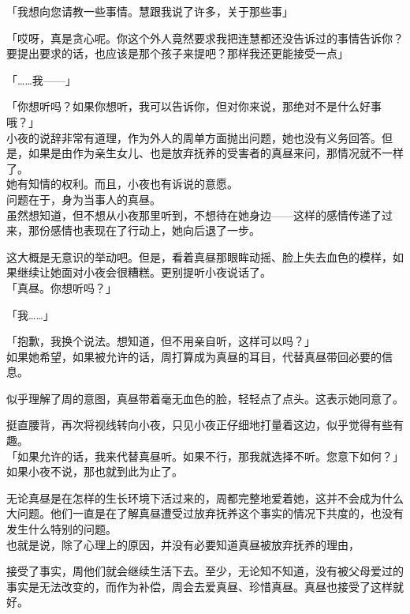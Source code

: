 「我想向您请教一些事情。慧跟我说了许多，关于那些事」

「哎呀，真是贪心呢。你这个外人竟然要求我把连慧都还没告诉过的事情告诉你？要提出要求的话，也应该是那个孩子来提吧？那样我还更能接受一点」

「……我——」

「你想听吗？如果你想听，我可以告诉你，但对你来说，那绝对不是什么好事哦？」\\

小夜的说辞非常有道理，作为外人的周单方面抛出问题，她也没有义务回答。但是，如果是由作为亲生女儿、也是放弃抚养的受害者的真昼来问，那情况就不一样了。\\

她有知情的权利。而且，小夜也有诉说的意愿。\\

问题在于，身为当事人的真昼。\\

虽然想知道，但不想从小夜那里听到，不想待在她身边——这样的感情传递了过来，那份感情也表现在了行动上，她向后退了一步。

这大概是无意识的举动吧。但是，看着真昼那眼眸动摇、脸上失去血色的模样，如果继续让她面对小夜会很糟糕。更别提听小夜说话了。\\

「真昼。你想听吗？」

「我……」

「抱歉，我换个说法。想知道，但不用亲自听，这样可以吗？」\\

如果她希望，如果被允许的话，周打算成为真昼的耳目，代替真昼带回必要的信息。

似乎理解了周的意图，真昼带着毫无血色的脸，轻轻点了点头。这表示她同意了。

挺直腰背，再次将视线转向小夜，只见小夜正仔细地打量着这边，似乎觉得有些有趣。\\

「如果允许的话，我来代替真昼听。如果不行，那我就选择不听。您意下如何？」\\

如果小夜不说，那也就到此为止了。

无论真昼是在怎样的生长环境下活过来的，周都完整地爱着她，这并不会成为什么大问题。他们一直是在了解真昼遭受过放弃抚养这个事实的情况下共度的，也没有发生什么特别的问题。\\

也就是说，除了心理上的原因，并没有必要知道真昼被放弃抚养的理由，

接受了事实，周他们就会继续生活下去。至少，无论知不知道，没有被父母爱过的事实是无法改变的，而作为补偿，周会去爱真昼、珍惜真昼。真昼也接受了这样就好。\\

